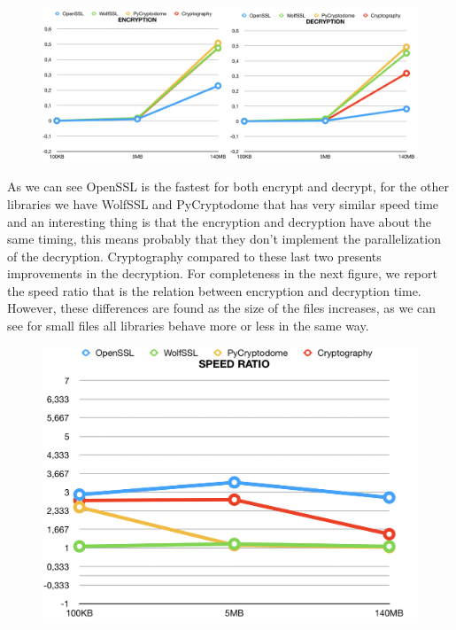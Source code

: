 \documentclass[11pt]{article}
\begin{document}
\begin{figure}[!ht]
 \includegraphics[width=1\textwidth]{pic2-hw4-1635747}
 \label{fig:Encryption and Decryption speed}
\end{figure}

As we can see OpenSSL is the fastest for both encrypt and decrypt, for the other libraries we have WolfSSL and PyCryptodome that has very similar speed time and an interesting thing is that the encryption and decryption have about the same timing, this means probably that they don't implement the parallelization of the decryption. Cryptography compared to these last two presents improvements in the decryption. For completeness in the next figure, we report the speed ratio that is the relation between encryption and decryption time. However, these differences are found as the size of the files increases, as we can see for small files all libraries behave more or less in the same way.

\begin{figure}[!ht]
 \includegraphics[width=1\textwidth]{pic3-hw4-1635747}
 \label{fig:Speed ratio}
\end{figure}
\end{document}
